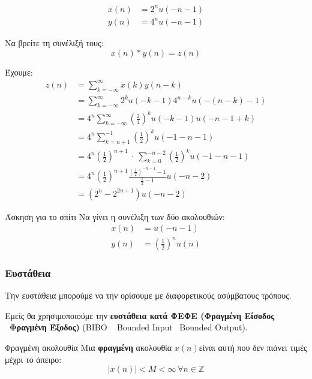 \documentclass[11pt,a4paper,notitlepage,fleqn]{article}
\begin{document}
\begin{exercise}
	\begin{align*}
	x(n) &= 2^n u(-n-1)\\
	y(n) &= 4^n u(-n-1)
	\end{align*}
	
	Να βρείτε τη συνέλιξή τους:
	\[
	x(n) * y(n) = z(n)
	\]
	
	\tcblower
	Έχουμε:
	\begin{align*}
		z(n) &= \sum_{k=-\infty}^{\infty} x(k)y(n-k)
		\\ &= \sum_{k=-\infty}^{\infty}
		2^k u(-k-1) 4^{n-k} u \left(-(n-k)-1\right)
		\\ &= 4^n\sum_{k=-\infty}^{\infty}\left(\frac{2}{4}\right)^k u(-k-1)u(-n-1+k)
		\\ &= 4^n\sum_{k=n+1}^{-1} \left(\frac{1}{2}\right)^k u(-1-n-1)
		\\ &= 4^n\left(\frac{1}{2}\right)^{n+1}\ \cdot \ \sum_{k=0}^{-n-2}\left(\frac{1}{2}\right)^k
		u(-1-n-1)
		\\ &= 4^n \left(\frac{1}{2}\right)^{n+1}
		\frac{\left(\frac{1}{2}\right)^{-n-1}-1}{\frac{1}{2}-1}u(-n-2)
		\\ &= \left(2^n-2^{2n+1}\right)u(-n-2)
	\end{align*}
\end{exercise}

\begin{questionbox}{Άσκηση για το σπίτι}
	Να γίνει η συνέλιξη των δύο ακολουθιών:
	\begin{align*}
		x(n) &= u(-n-1)\\
		y(n) &= \left(\frac{1}{2}\right)^n u(n)
	\end{align*}
\end{questionbox}

\subsubsection{Ευστάθεια}
Την ευστάθεια μπορούμε να την ορίσουμε με διαφορετικούς ασύμβατους τρόπους.

Εμείς θα χρησιμοποιούμε την \textbf{ευστάθεια κατά ΦΕΦΕ (Φραγμένη Είσοδος \textendash~Φραγμένη Έξοδος)} (BIBO \textemdash~ Bounded Input \textendash~Bounded Output).

\begin{defn}{Φραγμένη ακολουθία}{}
	Μια \textbf{φραγμένη} ακολουθία \( x(n) \)είναι αυτή που δεν πιάνει τιμές μέχρι το άπειρο:
	\[
	\left|x(n)\right| < M < \infty \ \forall n \in \mathbb Z
	\]
\end{defn}
\end{document}
